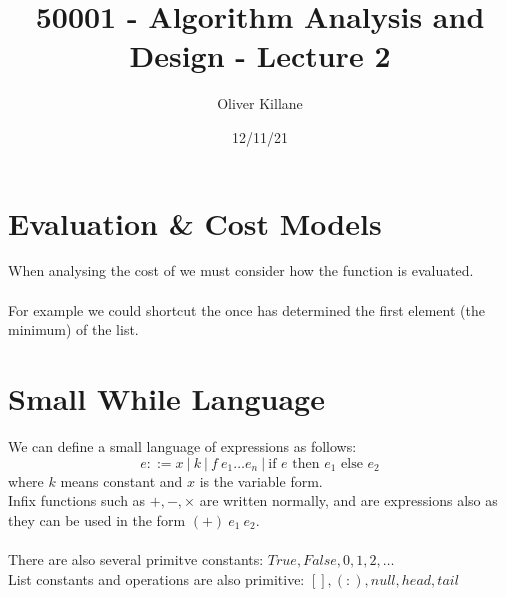 \documentclass{report}
\title{50001 - Algorithm Analysis and Design - Lecture 2}
\author{Oliver Killane}
\date{12/11/21}
\newcommand{\cond}[3]{\text{if } #1 \text{ then } #2 \text{ else } #3}
\begin{document}
    \maketitle

    \section*{Evaluation \& Cost Models}
        When analysing the cost of  we must consider how the function is evaluated.
        \\
        \\ For example we could shortcut the once  has determined the first element (the minimum) of the list.
        \\
    
    \section*{Small While Language}
        We can define a small language of expressions as follows:
        \[e ::= x \ | \ k \ | \ f \ e_1 \dots e_n \ | \ \cond{e}{e_1}{e_2}\]
        where $k$ means constant and $x$ is the variable form.
        \\ Infix functions such as $+, -, \times$ are written normally, and are expressions also as they can be used in the form $(+) \ e_1 \ e_2$.
        \\
        \\ There are also several primitve constants: $True, False, 0, 1, 2, \dots$
        \\ List constants and operations are also primitive: $[], (:), null, head, tail$
    
\end{document}
